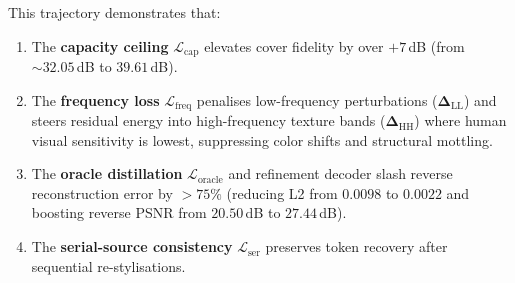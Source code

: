 \documentclass[11pt,a4paper]{article}
\begin{document}
\begin{center}
\end{center}

\noindent This trajectory demonstrates that:
\begin{enumerate}[leftmargin=*]
\item The \textbf{capacity ceiling} $\mathcal{L}_{\text{cap}}$ elevates cover fidelity by over $+7$\,dB (from $\sim 32.05$\,dB to $39.61$\,dB).
\item The \textbf{frequency loss} $\mathcal{L}_{\text{freq}}$ penalises low-frequency perturbations ($\boldsymbol{\Delta}_{\text{LL}}$) and steers residual energy into high-frequency texture bands ($\boldsymbol{\Delta}_{\text{HH}}$) where human visual sensitivity is lowest, suppressing color shifts and structural mottling.
\item The \textbf{oracle distillation} $\mathcal{L}_{\text{oracle}}$ and refinement decoder slash reverse reconstruction error by $>75\%$ (reducing L2 from $0.0098$ to $0.0022$ and boosting reverse PSNR from $20.50$\,dB to $27.44$\,dB).
\item The \textbf{serial-source consistency} $\mathcal{L}_{\text{ser}}$ preserves token recovery after sequential re-stylisations.
\end{enumerate}
\end{document}
